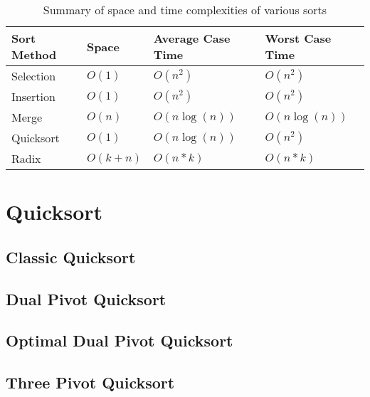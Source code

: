     \begin{table}
        \begin{center}
            \begin{tabular}{|l|l|l|l|}
                    \hline
                    Sort Method &   Space       &   Average Case Time   &   Worst Case Time     \\ \hline \hline
                    Selection   &   $O(1)$      &   $O(n^2)$            &   $O(n^2)$            \\ \hline
                    Insertion   &   $O(1)$      &   $O(n^2)$            &   $O(n^2)$            \\ \hline
                    Merge       &   $O(n)$      &   $O(n\log(n))$       &   $O(n\log(n))$       \\ \hline
                    Quicksort   &   $O(1)$      &   $O(n\log(n))$       &   $O(n^2)$            \\ \hline
                    Radix       &   $O(k + n)$  &   $O(n*k)$            &   $O(n*k)$            \\
                    \hline
                \end{tabular}
                \caption{Summary of space and time complexities of various sorts}
                \label{tab:spaceAndTime}
        \end{center}
    \end{table}

\section{Quicksort}
		
	\subsection{Classic Quicksort}
		\label{subsec:ClassicQSortIntro}
	
	\subsection{Dual Pivot Quicksort}
		\label{subsec:DualPivotQSortIntro}
	
	\subsection{Optimal Dual Pivot Quicksort}	
		\label{subsec:OptimalDualPivotQSortIntro}
	
	\subsection{Three Pivot Quicksort}	
		\label{subsec:ThreePivotQSortIntro}
	
